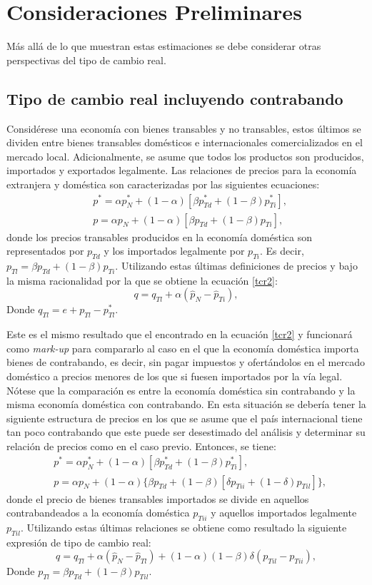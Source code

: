 \documentclass[12pt,letterpaper]{article}
\begin{document}
\section{Consideraciones Preliminares}\label{consid}
Más allá de lo que muestran estas estimaciones se debe considerar otras perspectivas del tipo de cambio real.

\subsection{Tipo de cambio real incluyendo contrabando}
Considérese una economía con bienes transables y no transables, estos últimos se dividen entre bienes transables domésticos e internacionales comercializados en el mercado local. Adicionalmente, se asume que todos los productos son producidos, importados y exportados legalmente. Las relaciones de precios para la economía extranjera y doméstica son caracterizadas por las siguientes ecuaciones:
\begin{align}
&p^*=\alpha p_N^*+(1-\alpha)[\beta p_{Td}^*+(1-\beta)p_{Ti}^*],\\
&p=\alpha p_N+(1-\alpha)[\beta p_{Td}+(1-\beta)p_{Ti}],
\end{align}
donde los precios transables producidos en la economía doméstica son representados por $p_{Td}$ y los importados legalmente por $p_{Ti}$. Es decir, $p_{Tl}=\beta p_{Td}+(1-\beta)p_{Ti}$.
Utilizando estas últimas definiciones de precios y bajo la misma racionalidad por la que se obtiene la ecuación \ref{tcr2}:
\begin{equation}\label{mark}
q=q_{Tl}+\alpha (\hat{p}_{N} - \hat{p}_{Ti}),
\end{equation}
Donde $q_{Tl}=e+p_{Tl}-p_{Tl}^*$. 

Este es el mismo resultado que el encontrado en la ecuación \ref{tcr2} y funcionará como \emph{mark-up} para compararlo al caso en el que la economía doméstica importa bienes de contrabando, es decir, sin pagar impuestos y ofertándolos en el mercado doméstico a precios menores de los que si fuesen importados por la vía legal. Nótese que la comparación es entre la economía doméstica sin contrabando y la misma economía doméstica con contrabando. En esta situación se debería tener la siguiente estructura de precios en los que se asume que el país internacional tiene tan poco contrabando que este puede ser desestimado del análisis y determinar su relación de precios como en el caso previo. Entonces, se tiene:
\begin{align}
&p^*=\alpha p_N^*+(1-\alpha)[\beta p_{Td}^*+(1-\beta)p_{Ti}^*],\\
&p=\alpha p_N+(1-\alpha)\{\beta p_{Td}+(1-\beta)[\delta p_{Tii} + (1-\delta)p_{Til}]\},
\end{align}
donde el precio de bienes transables importados se divide en aquellos contrabandeados a la economía doméstica $p_{Tii}$ y aquellos importados legalmente $p_{Til}$. Utilizando estas últimas relaciones se obtiene como resultado la siguiente expresión de tipo de cambio real:
\begin{equation}\label{contra}
q=q_{Tl}+\alpha (\hat{p}_{N} - \hat{p}_{Tl}) + (1-\alpha)(1-\beta)\delta (p_{Til}-p_{Tii}),
\end{equation}
Donde $p_{Tl}=\beta p_{Td}+(1-\beta)p_{Til}$.
\end{document}
